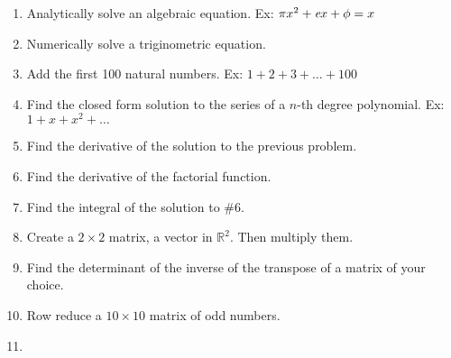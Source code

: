 \documentclass[11pt,letterpaper,twoside,titlepage]{report}
\begin{document}
			\begin{enumerate}
			
%				
					
				\item %
				
					Analytically solve an algebraic equation.  Ex: $ \pi x^2 + \emph{e} x + \phi = x $
					
				\item %
				
					Numerically solve a triginometric equation.
					
				\item %
				
					Add the first 100 natural numbers. Ex: $1+2+3+ \dots +100$
					
%				
%					
				\item %
				
					Find the closed form solution to the series of a $n$-th degree polynomial. Ex: $ 1 + x + x^2 + \dots $
					
				\item %
				
					Find the derivative of the solution to the previous problem.
					
				\item %
				
					Find the derivative of the factorial function.
					
				\item %
				
					Find the integral of the solution to \#6.
					
				\item %
				
					Create a $2\times 2$ matrix, a vector in $\mathbb{R}^2$.  Then multiply them.
					
				\item %
				
					Find the determinant of the inverse of the transpose of a matrix of your choice.
					
				\item %
				
					Row reduce a $10 \times 10$ matrix of odd numbers.
					
				\item %
				

\end{enumerate}
\end{document}
